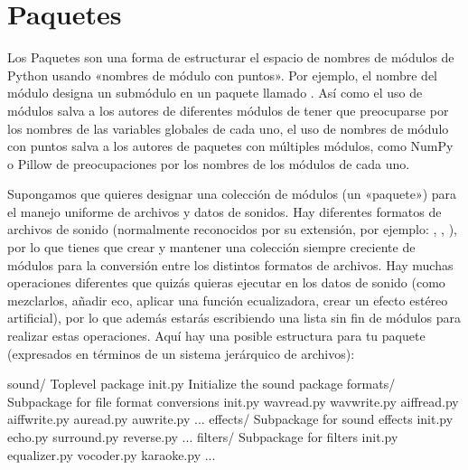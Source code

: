 \documentclass[a4,10pt,spanish]{sphinxmanual}
\begin{document}
\section{Paquetes}
\label{\detokenize{tutorial/modules:packages}}\label{\detokenize{tutorial/modules:tut-packages}}
\sphinxAtStartPar
Los Paquetes son una forma de estructurar el espacio de nombres de módulos de Python usando «nombres de módulo con puntos». Por ejemplo, el nombre del módulo  designa un submódulo  en un paquete llamado . Así como el uso de módulos salva a los autores de diferentes módulos de tener que preocuparse por los nombres de las variables globales de cada uno, el uso de nombres de módulo con puntos salva a los autores de paquetes con múltiples módulos, como NumPy o Pillow de preocupaciones por los nombres de los módulos de cada uno.

\sphinxAtStartPar
Supongamos que quieres designar una colección de módulos (un «paquete») para el manejo uniforme de archivos y datos de sonidos.  Hay diferentes formatos de archivos de sonido (normalmente reconocidos por su extensión, por ejemplo: , , ), por lo que tienes que crear y mantener una colección siempre creciente de módulos para la conversión entre los distintos formatos de archivos. Hay muchas operaciones diferentes que quizás quieras ejecutar en los datos de sonido (como mezclarlos, añadir eco, aplicar una función ecualizadora, crear un efecto estéreo artificial), por lo que además estarás escribiendo una lista sin fin de módulos para realizar estas operaciones.  Aquí hay una posible estructura para tu paquete (expresados en términos de un sistema jerárquico de archivos):

\begin{sphinxVerbatim}[commandchars=\\\{\}]
sound/                          Top\PYGZhy{}level package
      \PYGZus{}\PYGZus{}init\PYGZus{}\PYGZus{}.py               Initialize the sound package
      formats/                  Subpackage for file format conversions
              \PYGZus{}\PYGZus{}init\PYGZus{}\PYGZus{}.py
              wavread.py
              wavwrite.py
              aiffread.py
              aiffwrite.py
              auread.py
              auwrite.py
              ...
      effects/                  Subpackage for sound effects
              \PYGZus{}\PYGZus{}init\PYGZus{}\PYGZus{}.py
              echo.py
              surround.py
              reverse.py
              ...
      filters/                  Subpackage for filters
              \PYGZus{}\PYGZus{}init\PYGZus{}\PYGZus{}.py
              equalizer.py
              vocoder.py
              karaoke.py
              ...
\end{sphinxVerbatim}
\end{document}
